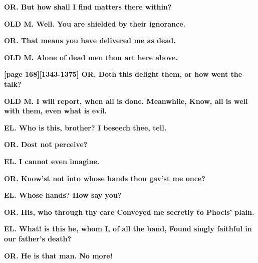 \documentclass[11pt,letter]{book}
\begin{document}
\par \textbf{OR. But how shall I find matters there within?}
\par 

\par \textbf{OLD M. Well. You are shielded by their ignorance.}
\par 

\par \textbf{OR. That means you have delivered me as dead.}
\par 

\par \textbf{OLD M. Alone of dead men thou art here above.}
\par 

\par \textbf{[page 168][1343-1375] OR. Doth this delight them, or how went the talk?}
\par 

\par \textbf{OLD M. I will report, when all is done. Meanwhile, Know, all is well with them, even what is evil.}
\par 

\par \textbf{EL. Who is this, brother? I beseech thee, tell.}
\par 

\par \textbf{OR. Dost not perceive?}
\par 

\par \textbf{EL. I cannot even imagine.}
\par 

\par \textbf{OR. Know’st not into whose hands thou gav’st me once?}
\par 

\par \textbf{EL. Whose hands? How say you?}
\par 

\par \textbf{OR. His, who through thy care Conveyed me secretly to Phocis’ plain.}
\par 

\par \textbf{EL. What! is this he, whom I, of all the band, Found singly faithful in our father’s death?}
\par 

\par \textbf{OR. He is that man. No more!}
\par 
\end{document}
